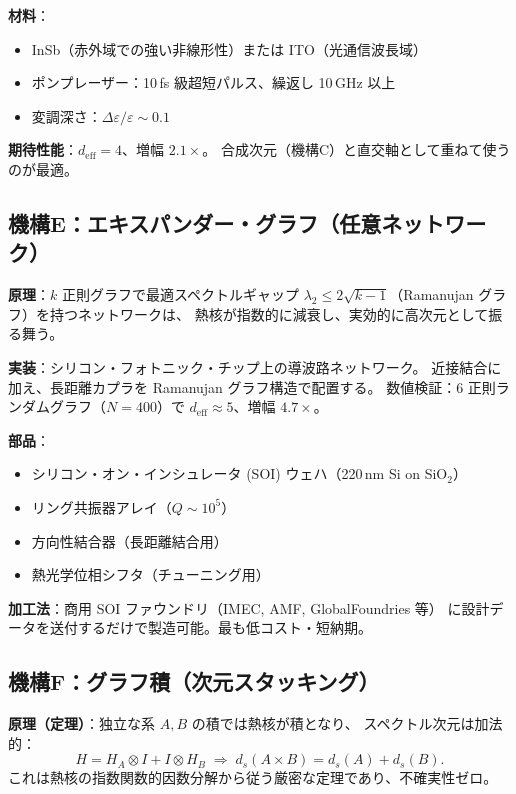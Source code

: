 \documentclass[11pt,a4paper]{article}
\newcommand{\deff}{d_{\mathrm{eff}}}
\begin{document}
\textbf{材料}：
\begin{itemize}[leftmargin=2em,nosep]
  \item InSb（赤外域での強い非線形性）または ITO（光通信波長域）
  \item ポンプレーザー：10\,fs 級超短パルス、繰返し 10\,GHz 以上
  \item 変調深さ：$\Delta\varepsilon/\varepsilon \sim 0.1$
\end{itemize}

\textbf{期待性能}：$\deff = 4$、増幅 $2.1\times$。
合成次元（機構C）と直交軸として重ねて使うのが最適。

\subsection{機構E：エキスパンダー・グラフ（任意ネットワーク）}
\label{sec:expander}

\textbf{原理}：$k$ 正則グラフで最適スペクトルギャップ
$\lambda_2 \leq 2\sqrt{k-1}$（Ramanujan グラフ）を持つネットワークは、
熱核が指数的に減衰し、実効的に高次元として振る舞う。

\textbf{実装}：シリコン・フォトニック・チップ上の導波路ネットワーク。
近接結合に加え、長距離カプラを Ramanujan グラフ構造で配置する。
数値検証：6 正則ランダムグラフ（$N=400$）で $\deff \approx 5$、増幅 $4.7\times$。

\textbf{部品}：
\begin{itemize}[leftmargin=2em,nosep]
  \item シリコン・オン・インシュレータ (SOI) ウェハ（220\,nm Si on SiO$_2$）
  \item リング共振器アレイ（$Q\sim 10^5$）
  \item 方向性結合器（長距離結合用）
  \item 熱光学位相シフタ（チューニング用）
\end{itemize}

\textbf{加工法}：商用 SOI ファウンドリ（IMEC, AMF, GlobalFoundries 等）
に設計データを送付するだけで製造可能。最も低コスト・短納期。

\subsection{機構F：グラフ積（次元スタッキング）}
\label{sec:graph_product}

\textbf{原理（定理）}：独立な系 $A,B$ の積では熱核が積となり、
スペクトル次元は加法的：
\[
H = H_A \otimes I + I \otimes H_B \;\Longrightarrow\;
d_s(A\times B) = d_s(A) + d_s(B).
\]
これは熱核の指数関数的因数分解から従う厳密な定理であり、不確実性ゼロ。
\end{document}
